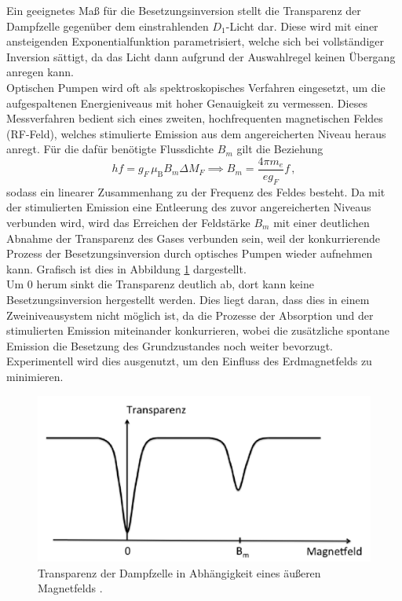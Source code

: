 \noindent Ein geeignetes Maß für die Besetzungsinversion stellt die Transparenz der Dampfzelle gegenüber dem einstrahlenden $D_1$-Licht dar. Diese wird mit einer ansteigenden Exponentialfunktion parametrisiert, welche sich bei vollständiger Inversion sättigt, da das Licht dann aufgrund der Auswahlregel keinen Übergang anregen kann.\\
Optischen Pumpen wird oft als spektroskopisches Verfahren eingesetzt, um die aufgespaltenen Energieniveaus mit hoher Genauigkeit zu vermessen. Dieses Messverfahren bedient sich eines zweiten, hochfrequenten magnetischen Feldes (RF-Feld), welches stimulierte Emission aus dem angereicherten Niveau heraus anregt. Für die dafür benötigte Flussdichte $B_m$ gilt die Beziehung
\begin{equation}
h f = g_F \, \mu_{\text{B}} B_m \Delta M_F \implies B_m = \frac{4 \pi m_e}{e g_F} f\,,
\label{eqn:B_M_Theorie}
\end{equation}
sodass ein linearer Zusammenhang zu der Frequenz des Feldes besteht.
Da mit der stimulierten Emission eine Entleerung des zuvor angereicherten Niveaus verbunden wird, wird das Erreichen der Feldstärke $B_m$ mit einer deutlichen Abnahme der Transparenz des Gases verbunden sein, weil der konkurrierende Prozess der Besetzungsinversion durch optisches Pumpen wieder aufnehmen kann. Grafisch ist dies in Abbildung \ref{fig:transparenz} dargestellt.\\
Um 0 herum sinkt die Transparenz deutlich ab, dort kann keine Besetzungsinversion hergestellt werden. Dies liegt daran, dass dies in einem Zweiniveausystem nicht möglich ist, da die Prozesse der Absorption und der stimulierten Emission miteinander konkurrieren, wobei die zusätzliche spontane Emission die Besetzung des Grundzustandes noch weiter bevorzugt. Experimentell wird dies ausgenutzt, um den Einfluss des Erdmagnetfelds zu minimieren.

\begin{figure}
    \centering
    \includegraphics[width=\textwidth]{content/images/transparenz.png}
  	\caption{Transparenz der Dampfzelle in Abhängigkeit eines äußeren Magnetfelds \cite{V21}.}
    \label{fig:transparenz}
\end{figure}

